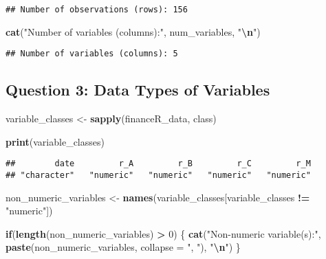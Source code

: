 \documentclass[
]{article}
\newenvironment{Shaded}{\begin{snugshade}}{\end{snugshade}}
\newcommand{\AttributeTok}[1]{\textcolor[rgb]{0.13,0.29,0.53}{#1}}
\newcommand{\ControlFlowTok}[1]{\textcolor[rgb]{0.13,0.29,0.53}{\textbf{#1}}}
\newcommand{\DecValTok}[1]{\textcolor[rgb]{0.00,0.00,0.81}{#1}}
\newcommand{\FunctionTok}[1]{\textcolor[rgb]{0.13,0.29,0.53}{\textbf{#1}}}
\newcommand{\NormalTok}[1]{#1}
\newcommand{\OtherTok}[1]{\textcolor[rgb]{0.56,0.35,0.01}{#1}}
\newcommand{\SpecialCharTok}[1]{\textcolor[rgb]{0.81,0.36,0.00}{\textbf{#1}}}
\newcommand{\StringTok}[1]{\textcolor[rgb]{0.31,0.60,0.02}{#1}}
\begin{document}
\begin{verbatim}
## Number of observations (rows): 156
\end{verbatim}

\begin{Shaded}
\begin{Highlighting}[]
\FunctionTok{cat}\NormalTok{(}\StringTok{"Number of variables (columns):"}\NormalTok{, num\_variables, }\StringTok{"}\SpecialCharTok{\textbackslash{}n}\StringTok{"}\NormalTok{)}
\end{Highlighting}
\end{Shaded}

\begin{verbatim}
## Number of variables (columns): 5
\end{verbatim}

\hypertarget{question-3-data-types-of-variables}{%
\subsection{Question 3: Data Types of
Variables}\label{question-3-data-types-of-variables}}

\begin{Shaded}
\begin{Highlighting}[]
\NormalTok{variable\_classes }\OtherTok{\textless{}{-}} \FunctionTok{sapply}\NormalTok{(financeR\_data, class)}

\FunctionTok{print}\NormalTok{(variable\_classes)}
\end{Highlighting}
\end{Shaded}

\begin{verbatim}
##        date         r_A         r_B         r_C         r_M 
## "character"   "numeric"   "numeric"   "numeric"   "numeric"
\end{verbatim}

\begin{Shaded}
\begin{Highlighting}[]
\NormalTok{non\_numeric\_variables }\OtherTok{\textless{}{-}} \FunctionTok{names}\NormalTok{(variable\_classes[variable\_classes }\SpecialCharTok{!=} \StringTok{"numeric"}\NormalTok{])}

\ControlFlowTok{if}\NormalTok{(}\FunctionTok{length}\NormalTok{(non\_numeric\_variables) }\SpecialCharTok{\textgreater{}} \DecValTok{0}\NormalTok{) \{}
  \FunctionTok{cat}\NormalTok{(}\StringTok{"Non{-}numeric variable(s):"}\NormalTok{, }\FunctionTok{paste}\NormalTok{(non\_numeric\_variables, }\AttributeTok{collapse =} \StringTok{", "}\NormalTok{), }\StringTok{"}\SpecialCharTok{\textbackslash{}n}\StringTok{"}\NormalTok{)}
\NormalTok{\}}
\end{Highlighting}
\end{Shaded}
\end{document}
